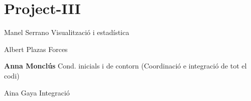 \chapter{Project-\/\+III}
\hypertarget{md_README}{}\label{md_README}
\label{md_README_autotoc_md0}%
%
 Manel Serrano Visualització i estadística

Albert Plazas Forces

{\bfseries{Anna Monclús}} Cond. inicials i de contorn (Coordinació e integració de tot el codi)

Aina Gaya Integració 